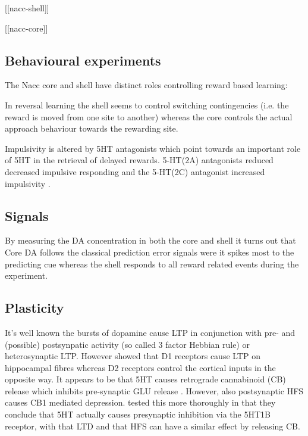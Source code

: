 \documentclass[12pt,a4paper]{article}
\begin{document}
[[nacc-shell]]

[[nacc-core]]

\subsection{Behavioural experiments}

The Nacc core and shell have distinct roles controlling reward based learning:

In reversal learning \citep{Dalton2014} the shell seems to control switching contingencies (i.e. the reward is moved from one site to another) whereas the core controls the actual approach behaviour towards the rewarding site.

Impulsivity is altered by 5HT antagonists which point towards an important role of 5HT in the retrieval of delayed rewards. 5-HT(2A) antagonists reduced decreased impulsive responding and the 5-HT(2C) antagonist increased impulsivity \citep{Robinson2008}.

\subsection{Signals}

By measuring the DA concentration in both the core and shell \citep{Saddoris2015} it turns out that Core DA follows the classical prediction error signals were it spikes most to the predicting cue whereas the shell responds to all reward related events during the experiment.

\subsection{Plasticity}

It's well known the bursts of dopamine cause LTP in conjunction with pre- and (possible) postsynpatic activity (so called 3 factor Hebbian rule) or heterosynaptic LTP. However \citep{Goto2005} showed that D1 receptors cause LTP on hippocampal fibres whereas D2 receptors control the cortical inputs in the opposite way.
It appears to be that 5HT causes retrograde cannabinoid (CB) release which inhibits pre-synaptic GLU release \citep{Burattini2014}. However, also postsynaptic HFS causes CB1 mediated depression. \citep{Mathur2011} tested this more thoroughly in that they conclude that 5HT actually causes presynaptic inhibition via the 5HT1B receptor, with that LTD and that HFS can have a similar effect by releasing CB.
\end{document}
